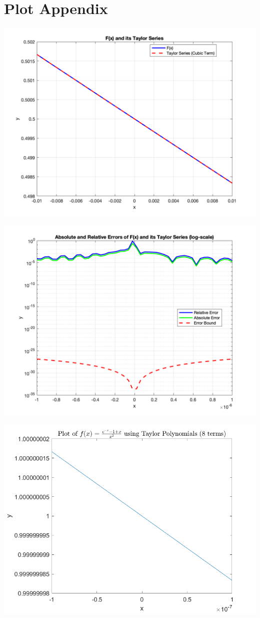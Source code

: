 \documentclass[11pt]{article}
\begin{document}


\section*{Plot Appendix}

\includegraphics[width=0.8\linewidth]{lab1b_2.png}

\includegraphics[width=0.8\linewidth]{lab1b_3_error_bound.png}

\includegraphics[width=0.8\linewidth]{Lab1BQ4p1q2.png}
\end{document}
